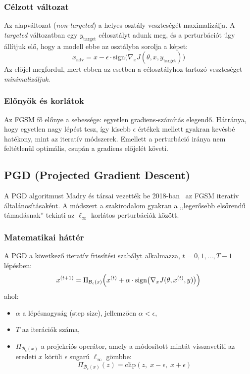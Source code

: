 \documentclass[12pt,a4paper]{article}
\begin{document}
\subsubsection{Célzott változat}

Az alapváltozat (\textit{non-targeted}) a helyes osztály veszteségét maximalizálja. A \textit{targeted}
változatban egy $y_{\mathrm{target}}$ célosztályt adunk meg, és a perturbációt úgy állítjuk elő, hogy a
modell ebbe az osztályba sorolja a képet:
\[
  x_{\mathrm{adv}} = x - \epsilon \cdot \mathrm{sign}\bigl(\nabla_x J(\theta, x, y_{\mathrm{target}})\bigr)
\]
Az előjel megfordul, mert ebben az esetben a célosztályhoz tartozó veszteséget \textit{minimalizáljuk}.

\subsubsection{Előnyök és korlátok}

Az FGSM fő előnye a sebessége: egyetlen gradiens-számítás elegendő. Hátránya, hogy egyetlen nagy lépést tesz,
így kisebb $\epsilon$ értékek mellett gyakran kevésbé hatékony, mint az iteratív módszerek. Emellett a
perturbáció iránya nem feltétlenül optimális, csupán a gradiens előjelét követi.

\subsection{PGD (Projected Gradient Descent)}

A PGD algoritmust Madry és társai vezették be 2018-ban~\cite{madry2018towards} az FGSM iteratív
általánosításaként. A módszert a szakirodalom gyakran a ,,legerősebb elsőrendű támadásnak'' tekinti
az $\ell_\infty$ korlátos perturbációk között.

\subsubsection{Matematikai háttér}

A PGD a következő iteratív frissítési szabályt alkalmazza, $t = 0, 1, \ldots, T-1$ lépésben:
\[
  x^{(t+1)} = \Pi_{\mathcal{B}_\epsilon(x)} \Bigl(
    x^{(t)} + \alpha \cdot \mathrm{sign}\bigl(\nabla_x J(\theta, x^{(t)}, y)\bigr)
  \Bigr)
\]
ahol:
\begin{itemize}
  \item $\alpha$ a lépésnagyság (step size), jellemzően $\alpha < \epsilon$,
  \item $T$ az iterációk száma,
  \item $\Pi_{\mathcal{B}_\epsilon(x)}$ a projekciós operátor, amely a módosított mintát visszavetíti
        az eredeti $x$ körüli $\epsilon$ sugarú $\ell_\infty$ gömbbe:
        \[
          \Pi_{\mathcal{B}_\epsilon(x)}(z) = \mathrm{clip}(z,\; x - \epsilon,\; x + \epsilon)
        \]
\end{itemize}
\end{document}
